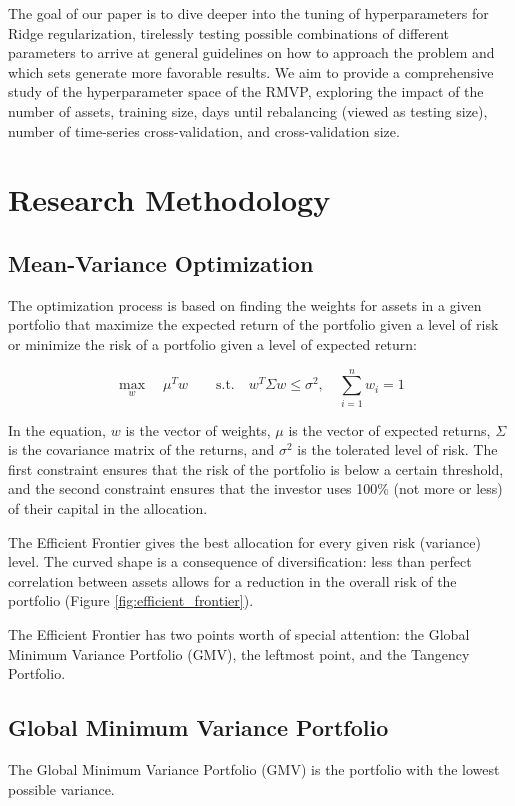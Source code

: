 \documentclass{article}
\begin{document}
The goal of our paper is to dive deeper into the tuning of hyperparameters for Ridge regularization, tirelessly testing possible combinations of different parameters to arrive at general guidelines on how to approach the problem and which sets generate more favorable results. We aim to provide a comprehensive study of the hyperparameter space of the RMVP, exploring the impact of the number of assets, training size, days until rebalancing (viewed as testing size), number of time-series cross-validation, and cross-validation size.

\FloatBarrier
\section{Research Methodology}
\FloatBarrier
\subsection{Mean-Variance Optimization}
The optimization process is based on finding the weights for assets in a given portfolio that maximize the expected return of the portfolio given a level of risk or minimize the risk of a portfolio given a level of expected return:

$$
\max_{w} \quad \mu^{T} w \quad \quad
\text{s.t.} \quad w^{T} \Sigma w \leq \sigma^{2}, \quad
\sum_{i=1}^{n} w_{i} = 1
$$

In the equation, $w$ is the vector of weights, $\mu$ is the vector of expected returns, $\Sigma$ is the covariance matrix of the returns, and $\sigma^{2}$ is the tolerated level of risk. The first constraint ensures that the risk of the portfolio is below a certain threshold, and the second constraint ensures that the investor uses 100\% (not more or less) of their capital in the allocation.

The Efficient Frontier gives the best allocation for every given risk (variance) level. The curved shape is a consequence of diversification: less than perfect correlation between assets allows for a reduction in the overall risk of the portfolio (Figure \ref{fig:efficient_frontier}).

The Efficient Frontier has two points worth of special attention: the Global Minimum Variance Portfolio (GMV), the leftmost point, and the Tangency Portfolio.

\FloatBarrier
\subsection{Global Minimum Variance Portfolio}
The Global Minimum Variance Portfolio (GMV) is the portfolio with the lowest possible variance.
\end{document}
